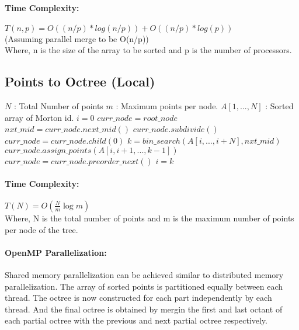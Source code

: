 \documentclass[11pt]{article}
\begin{document}
\paragraph{Time Complexity:}
$T(n,p) = O((n/p)*log(n/p)) + O((n/p)*log(p))$ \\
(Assuming parallel merge to be O(n/p)) \\
Where, n is the size of the array to be sorted and p is the number of 
processors.


\subsection{Points to Octree (Local)}

\begin{algorithm}[H]
\caption{$p2oLocal (Sequential)$}
\label{p2o_local}
\begin{algorithmic}
  \STATE $N$ : Total Number of points
  \STATE $m$ : Maximum points per node.
  \STATE $A[1,...,N]$ : Sorted array of Morton id.
  \STATE {}
  \STATE $i = 0$
  \STATE $curr\_node = root\_node$ 
    \STATE $nxt\_mid = curr\_node.next\_mid()$ 
      \STATE $curr\_node.subdivide()$
      \STATE $curr\_node = curr\_node.child(0)$ 
    \ELSE
      \STATE $k = bin\_search( A[i,...,i+N], nxt\_mid )$
      \STATE $curr\_node.assign\_points( A[i, i+1, ... , k-1] )$
      \STATE $curr\_node = curr\_node.preorder\_next()$ 
      \STATE $i = k$
    \ENDIF
  \ENDWHILE
\end{algorithmic}
\end{algorithm}

\paragraph{Time Complexity:}
$T(N) = O( \frac{N}{m} \log m )$ \\
Where, N is the total number of points and m is the maximum number of points 
per node of the tree.

\paragraph{OpenMP Parallelization:}
Shared memory parallelization can be achieved similar to distributed memory 
parallelization. The array of sorted points is partitioned equally between each 
thread. The octree is now constructed for each part independently by each 
thread. And the final octree is obtained by mergin the first and last octant of 
each partial octree with the previous and next partial octree respectively.
\end{document}
